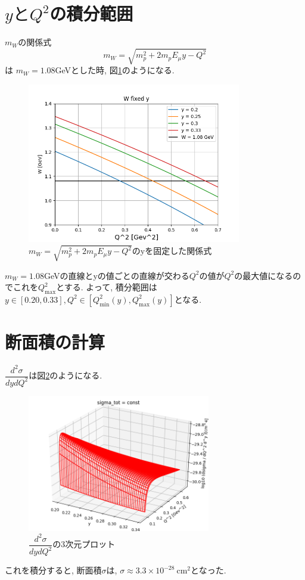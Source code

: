 \section{\texorpdfstring{$yとQ^2$}{LG}の積分範囲}
$m_W$の関係式
\begin{equation}
    m_W = \sqrt{m_p^2 + 2m_pE_\mu y - Q^2}
\end{equation}
は
$m_W = 1.08$GeVとした時, 図\ref{fig:sigma5}のようになる.
\begin{figure}[H]
    \centering
    \includegraphics[height=7cm]{img/W2_fixed_y.png}
    \caption{$m_W = \sqrt{m_p^2 + 2m_pE_\mu y - Q^2}$のyを固定した関係式}
    \label{fig:sigma5}
\end{figure}
$m_W = 1.08$GeVの直線とyの値ごとの直線が交わる$Q^2$の値が$Q^2$の最大値になるのでこれを$Q^2_{\mathrm{max}}$とする.
よって, 積分範囲は$y \in [0.20, 0.33], Q^2 \in [Q^2_{\mathrm{min}}(y), Q^2_{\mathrm{max}}(y)]$となる.

\section{断面積の計算}
$\dfrac{d^2\sigma}{dydQ^2}$は図\ref{fig:sigma6}のようになる.
\begin{figure}[H]
    \centering
    \includegraphics[width=8cm]{img/integrate_flux_used_artile.png}
    \caption{$\dfrac{d^2\sigma}{dydQ^2}$の3次元プロット}
    \label{fig:sigma6}
\end{figure}
これを積分すると, 断面積$\sigma$は, $\sigma \approx 3.3 \times 10^{-28} \ \mathrm{cm^2}$となった.

